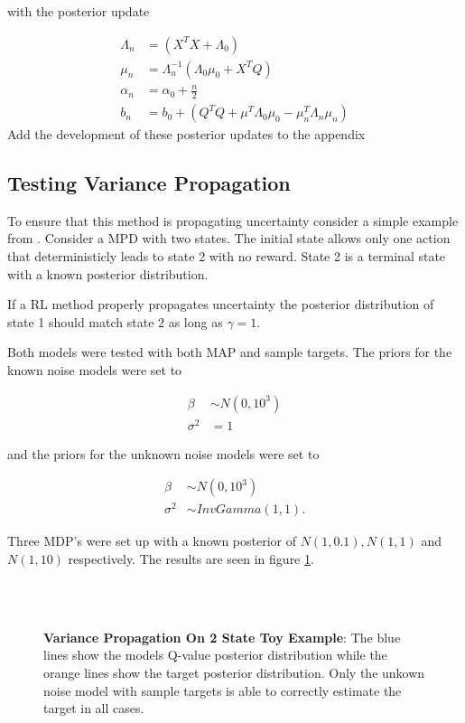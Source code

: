 with the posterior update


\begin{align*}
	\Lambda_n & = (X^TX + \Lambda_0)                                         \\
	\mu_n     & = \Lambda_n^{-1}(\Lambda_0\mu_0 + X^TQ)                      \\
	\alpha_n  & = \alpha_0 + \frac{n}{2}                                     \\
	b_n       & = b_0 + (Q^TQ + \mu^T\Lambda_0\mu_0 - \mu_n^T\Lambda_n\mu_n) 
\end{align*}
\todo Add the development of these posterior updates to the appendix

\subsection{Testing Variance Propagation}

To ensure that this method is propagating uncertainty consider a simple example from \cite{osband_2018}. Consider a MPD with two states. The initial state allows only one action that deterministicly leads to state 2 with no reward. State 2 is a terminal state with a known posterior distribution.

If a RL method properly propagates uncertainty the posterior distribution of state 1 should match state 2 as long as $\gamma=1$. 

Both models were tested with both MAP and sample targets. The priors for the known noise models were set to

\begin{align*}
    \beta &\sim N(0,10^3)\\
    \sigma^2 &= 1
\end{align*}

and the priors for the unknown noise models were set to

\begin{align*}
    \beta &\sim N(0,10^3) \\
    \sigma^2 &\sim InvGamma(1,1).
\end{align*}

Three MDP's were set up with a known posterior of $N(1, 0.1), N(1, 1)$ and $N(1, 10)$ respectively. The results are seen in figure \ref{fig:proptest}.

\begin{figure}[H]
    \centering
    \\
    \\
    \caption{\textbf{Variance Propagation On 2 State Toy Example}: The blue lines show the models Q-value posterior distribution while the orange lines show the target posterior distribution. Only the unkown noise model with sample targets is able to correctly estimate the target in all cases.}
    \label{fig:proptest}
\end{figure}


